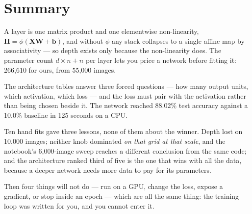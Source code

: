 \documentclass[11pt,a4paper]{article}
\begin{document}
\section*{Summary}

A layer is one matrix product and one elementwise non-linearity,
$\mathbf{H} = \phi(\mathbf{X}\mathbf{W} + \mathbf{b})$, and without $\phi$ any
stack collapses to a single affine map by associativity --- so depth exists
only because the non-linearity does. The parameter count $d\times n + n$ per
layer lets you price a network before fitting it: 266{,}610 for ours, from
55{,}000 images.

The architecture tables answer three forced questions --- how many output
units, which activation, which loss --- and the loss must pair with the
activation rather than being chosen beside it. The network reached 88.02\% test
accuracy against a 10.0\% baseline in 125 seconds on a CPU.

Ten hand fits gave three lessons, none of them about the winner. Depth lost on
10{,}000 images; neither knob dominated \emph{on that grid at that scale}, and
the notebook's 6{,}000-image sweep reaches a different conclusion from the same
code; and the architecture ranked third of five is the one that wins with all
the data, because a deeper network needs more data to pay for its parameters.

Then four things  will not do --- run on a GPU, change the
loss, expose a gradient, or stop inside an epoch --- which are all the same
thing: the training loop was written for you, and you cannot enter it.
\end{document}
